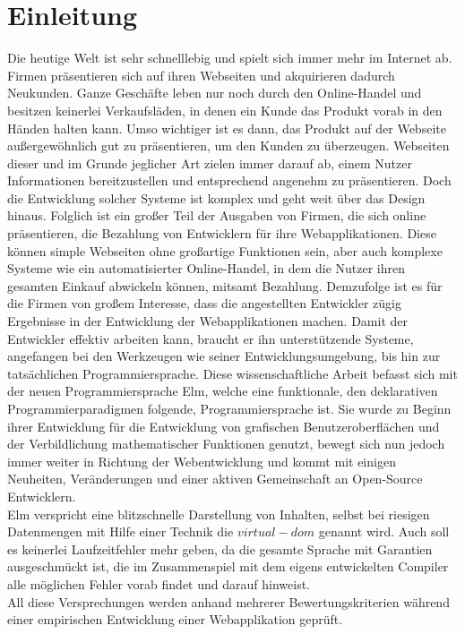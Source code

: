 \chapter{Einleitung}
\label{sec:einleitung}
Die heutige Welt ist sehr schnelllebig und spielt sich immer mehr im Internet ab. Firmen präsentieren sich auf ihren Webseiten und akquirieren dadurch Neukunden. Ganze Geschäfte leben nur noch durch den Online-Handel und besitzen keinerlei Verkaufsläden, in denen ein Kunde das Produkt vorab in den Händen halten kann. Umso wichtiger ist es dann, das Produkt auf der Webseite außergewöhnlich gut zu präsentieren, um den Kunden zu überzeugen. Webseiten dieser und im Grunde jeglicher Art zielen immer darauf ab, einem Nutzer Informationen bereitzustellen und entsprechend angenehm zu präsentieren. Doch die Entwicklung solcher Systeme ist komplex und geht weit über das Design hinaus. Folglich ist ein großer Teil der Ausgaben von Firmen, die sich online präsentieren, die Bezahlung von Entwicklern für ihre Webapplikationen. Diese können simple Webseiten ohne großartige Funktionen sein, aber auch komplexe Systeme wie ein automatisierter Online-Handel, in dem die Nutzer ihren gesamten Einkauf abwickeln können, mitsamt Bezahlung. Demzufolge ist es für die Firmen von großem Interesse, dass die angestellten Entwickler zügig Ergebnisse in der Entwicklung der Webapplikationen machen. Damit der Entwickler effektiv arbeiten kann, braucht er ihn unterstützende Systeme, angefangen bei den Werkzeugen wie seiner Entwicklungsumgebung, bis hin zur tatsächlichen Programmiersprache. Diese wissenschaftliche Arbeit befasst sich mit der neuen Programmiersprache Elm, welche eine funktionale, den deklarativen Programmierparadigmen folgende, Programmiersprache ist. Sie wurde zu Beginn ihrer Entwicklung für die Entwicklung von grafischen Benutzeroberflächen und der Verbildlichung mathematischer Funktionen genutzt, bewegt sich nun jedoch immer weiter in Richtung der Webentwicklung und kommt mit einigen Neuheiten, Veränderungen und einer aktiven Gemeinschaft an Open-Source Entwicklern.\\
Elm verspricht eine blitzschnelle Darstellung von Inhalten, selbst bei riesigen Datenmengen mit Hilfe einer Technik die $virtual-dom$ genannt wird. Auch soll es keinerlei Laufzeitfehler mehr geben, da die gesamte Sprache mit Garantien ausgeschmückt ist, die im Zusammenspiel mit dem eigens entwickelten Compiler alle möglichen Fehler vorab findet und darauf hinweist.\\
All diese Versprechungen werden anhand mehrerer Bewertungskriterien während einer empirischen Entwicklung einer Webapplikation geprüft.